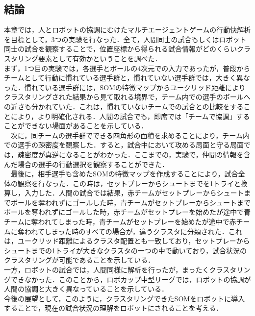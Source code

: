 \subsection{結論}
本章では，人とロボットの協調にむけたマルチエージェントゲームの行動快解析を目標として，3つの実験を行なった．全て，人間同士の試合もしくはロボット同士の試合を観察することで，位置座標から得られる試合情報がどのくらいクラスタリング要素として有効かということを調べた．\\
 まず，1つ目の実験では，各選手とボールの4次元での入力であったが，普段からチームとして行動に慣れている選手群と，慣れていない選手群では，大きく異なった．慣れている選手群には，SOMの特徴マップからユークリッド距離によりクラスタリングされた結果から見て取れる境界で，チーム内での選手のボールへの近さも分かれていた．これは，慣れていないチームでの試合との比較をすることにより，より明確化される．人間の試合でも，即席では「チームで協調」することができない場面があることを示している．\\
　次に，同チームの選手群でできる四角形の面積を求めることにより，チーム内での選手の疎密度を観察した．すると，試合中において攻める局面と守る局面では，疎密度が真逆になることがわかった．ここまでの，実験で，仲間の情報を含んだ場合の選手の行動選択を観察することができた．\\
　最後に，相手選手も含めたSOMの特徴マップを作成することにより，試合全体の観察を行なった．この時は，セットプレーからシュートまでを1トライと換算し，入力した．人間の試合では結果，赤チームがセットプレーからシュートまでボールを奪われずにゴールした時，青チームがセットプレーからシュートまでボールを奪われずにゴールした時，赤チームがセットプレーを始めたが途中で青チームに奪われてしまった時，青チームがセットプレーを始めたが途中で赤チームに奪われてしまった時のすべての場合が，違うクラスタに分類された．これは，ユークリッド距離によるクラスタ配置とも一致しており，セットプレーからシュートまでの1トライが大きなクラスタの一つの中で動いており，試合状況のクラスタリングが可能であることを示している．\\
  一方，ロボットの試合では，人間同様に解析を行ったが，まったくクラスタリングできなかった．このことから，ロボカップ中型リーグでは，ロボットの協調が人間の協調と大きく異なっていることを示している．\\
 今後の展望として，このように，クラスタリングできたSOMをロボットに導入することで，現在の試合状況の理解をロボットにされることを考える．




 





















